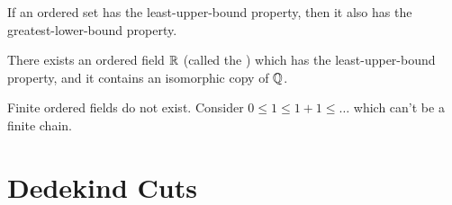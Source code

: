 \documentclass{mathnotes}
\begin{document}
\begin{prop}
  If an ordered set has the least-upper-bound property, then it also has the
  greatest-lower-bound property.
\end{prop}

\begin{defi}
  There exists an ordered field $\mathbb{R}$ (called the ) which
  has the least-upper-bound property, and it contains an isomorphic copy of
  $\mathbb{Q}$.
\end{defi}

\begin{note}
  Finite ordered fields do not exist. Consider $0\leq1\leq1+1\leq\ldots$ which
  can't be a finite chain.
\end{note}

\section*{Dedekind Cuts}
\end{document}
